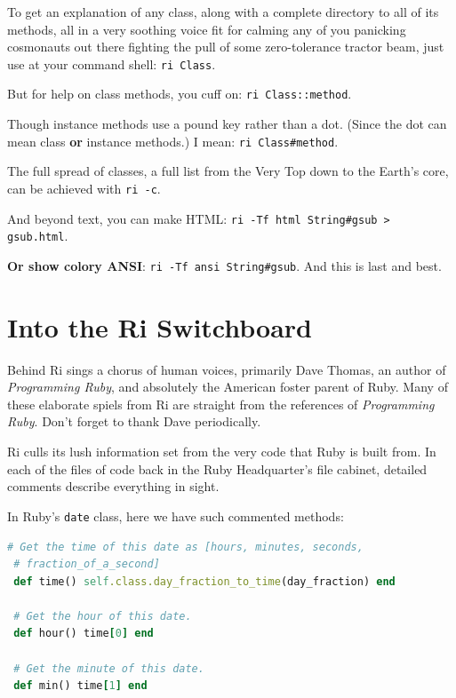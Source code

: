 \documentclass[10pt,twoside]{report}
\begin{document}
To get an explanation of any class, along with a complete directory to
all of its methods, all in a very soothing voice fit for calming any
of you panicking cosmonauts out there fighting the pull of some
zero-tolerance tractor beam, just use at your command shell: 
\lstinline[breaklines=false]|ri Class|.

But for help on class methods, you cuff on: 
\lstinline[breaklines=false]|ri Class::method|.

Though instance methods use a pound key rather than a dot. (Since the
dot can mean class \textbf{or} instance methods.) I mean: 
\lstinline[breaklines=false]|ri Class#method|.

The full spread of classes, a full list from the Very Top down to the
Earth's core, can be achieved with \lstinline[breaklines=false]|ri -c|.

And beyond text, you can make HTML: 
\lstinline[breaklines=false]|ri -Tf html String#gsub > gsub.html|.

\textbf{Or show colory ANSI}: 
\lstinline[breaklines=false]|ri -Tf ansi String#gsub|. And this is
last and best.

\section{Into the Ri Switchboard}

Behind Ri sings a chorus of human voices, primarily Dave Thomas, an
author of \emph{Programming Ruby}, and absolutely the American foster parent
of Ruby. Many of these elaborate spiels from Ri are straight from the
references of \emph{Programming Ruby}. Don't forget to thank Dave
periodically.

Ri culls its lush information set from the very code that Ruby is
built from. In each of the files of code back in the Ruby
Headquarter's file cabinet, detailed comments describe everything in
sight.

In Ruby's \lstinline[breaklines=false]|date| class, here we have such commented methods:

\begin{lstlisting}[basicstyle=\ttfamily\color{basiccolor},
    commentstyle = \ttfamily\color{commentcolor},
    keywordstyle=\ttfamily\color{keywordscolor},
    stringstyle=\color{stringcolor},
    language=Ruby,
    basicstyle=\small\ttfamily,
    showstringspaces=false,
  ]
 # Get the time of this date as [hours, minutes, seconds,
 # fraction_of_a_second]
 def time() self.class.day_fraction_to_time(day_fraction) end

 # Get the hour of this date.
 def hour() time[0] end

 # Get the minute of this date.
 def min() time[1] end
\end{lstlisting}
\end{document}
